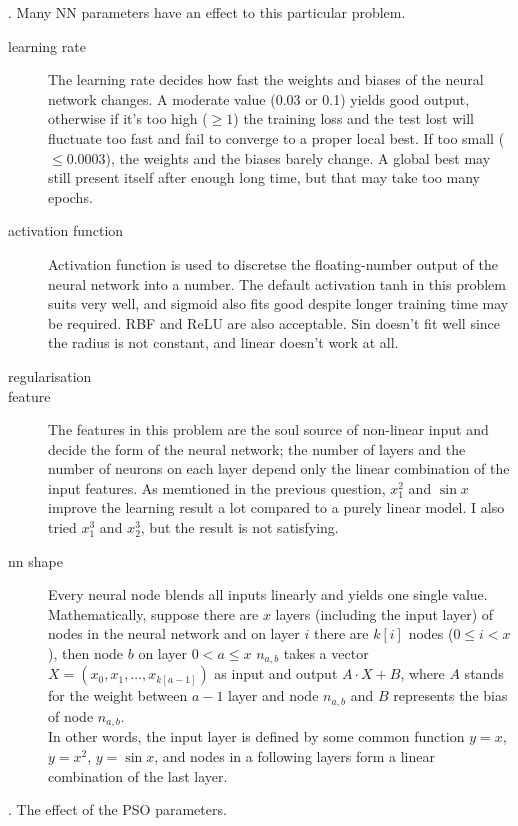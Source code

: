 \documentclass[12pt]{article}
\begin{document}
. Many NN parameters have an effect to this particular problem.
\begin{description}
    \item[learning rate] The learning rate decides how fast the weights and biases of the neural network changes. A moderate value (0.03 or 0.1) yields good output, otherwise if it's too high ($\geq 1$) the training loss and the test lost will fluctuate too fast and fail to converge to a proper local best. If too small ($\leq 0.0003$), the weights and the biases barely change. A global best may still present itself after enough long time, but that may take too many epochs.
    \item[activation function] Activation function is used to discretse the floating-number output of the neural network into a number. The default activation tanh in this problem suits very well, and sigmoid also fits good despite longer training time may be required. RBF and ReLU are also acceptable. Sin doesn't fit well since the radius is not constant, and linear doesn't work at all.
    \item[regularisation]
    \item[feature] The features in this problem are the soul source of non-linear input and decide the form of the neural network; the number of layers and the number of neurons on each layer depend only the linear combination of the input features. As memtioned in the previous question, $x_1^2$ and $\sin x$ improve the learning result a lot compared to a purely linear model. I also tried $x_1^3$ and $x_2^3$, but the result is not satisfying.
    \item[nn shape] Every neural node blends all inputs linearly and yields one single value. Mathematically, suppose there are $x$ layers (including the input layer) of nodes in the neural network and on layer $i$ there are $k[i]$ nodes ($0\leq i<x$), then node $b$ on layer $0<a\leq x$ $n_{a,b}$ takes a vector 
    $X=(x_0,x_1,\ldots,x_{k[a-1]})$ as input and output $A\cdot X+B$, where $A$ stands for the weight between $a-1$ layer and node $n_{a,b}$ and $B$ represents the bias of node $n_{a,b}$.\\
    In other words, the input layer is defined by some common function $y=x$, $y=x^2$, $y=\sin x$, and nodes in a following layers form a linear combination of the last layer.
    
      
\end{description}
. The effect of the PSO parameters.
\end{document}
